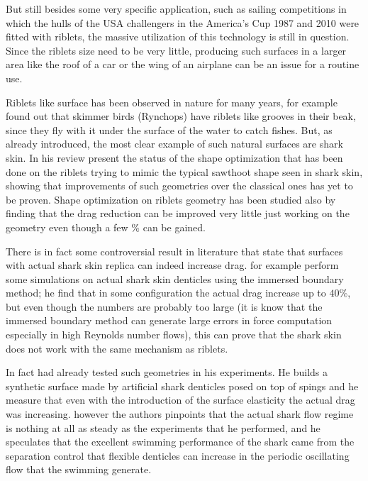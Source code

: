But still besides some very specific application, such as  sailing competitions in which the hulls of the USA challengers in the America’s Cup 1987 and 2010 were fitted with riblets, the massive utilization of this technology is still in question.
Since the riblets size need to be very little, producing such surfaces in a larger area like the roof of a car or the wing of an airplane can be an issue for a routine use.

Riblets like surface has been observed in nature for many years, for example \citet{Martin2016riblets} found out that skimmer birds (Rynchops) have riblets like grooves in their beak, since they fly with it under the surface of the water to catch fishes.
But, as already introduced, the most clear example of such natural surfaces are shark skin.
In his review \citet{dean2010shark} present the status of the shape optimization that has been done on the riblets trying to mimic the typical sawthoot shape seen in shark skin, showing that improvements of such geometries over the classical ones has yet to be proven.
Shape optimization on riblets geometry has been studied also by \citet{bechert1997experiments} finding that the drag reduction can be improved very little just working on the geometry even though a few $\%$ can be gained.

There is in fact some controversial result in literature that state that surfaces with actual shark skin replica can indeed increase drag.
\citet{boomsma2016direct} for example perform some simulations on actual shark skin denticles using the immersed boundary method; he find that in some configuration 
the actual drag increase up to $40\%$, but even though the numbers are probably too large (it is know that the immersed boundary method can generate large errors in force computation especially in high Reynolds number flows), this can prove that the shark skin does not work with the same mechanism as riblets.

In fact \citet{bechert1997natural} had already tested such geometries in his experiments. 
He builds a synthetic surface made by artificial shark denticles posed on top of spings and he measure that even with the introduction of the surface elasticity the actual drag was increasing.
however the authors pinpoints that the actual shark flow regime is nothing at all as steady as the experiments that he performed, and he speculates that the excellent swimming performance of the shark came from the separation control that flexible denticles can increase in the periodic oscillating flow that the swimming generate.

